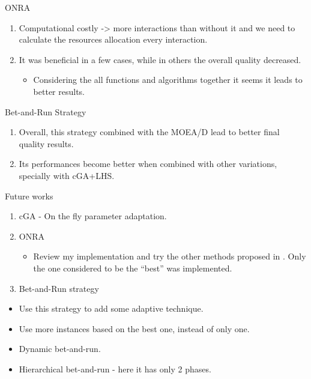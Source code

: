 \documentclass[ignorenonframetext,]{beamer}
\providecommand{\tightlist}{%
  \setlength{\itemsep}{0pt}\setlength{\parskip}{0pt}}
\begin{document}
\begin{frame}{ONRA}

\begin{enumerate}
\def\labelenumi{\arabic{enumi}.}
\tightlist
\item
  Computational costly -\textgreater{} more interactions than without it
  and we need to calculate the resources allocation every interaction.
\item
  It was beneficial in a few cases, while in others the overall quality
  decreased.

  \begin{itemize}
  \tightlist
  \item
    Considering the all functions and algorithms together it seems it
    leads to better results.
  \end{itemize}
\end{enumerate}

\end{frame}

\begin{frame}{Bet-and-Run Strategy}

\begin{enumerate}
\def\labelenumi{\arabic{enumi}.}
\tightlist
\item
  Overall, this strategy combined with the MOEA/D lead to better final
  quality results.
\item
  Its performances become better when combined with other variations,
  specially with cGA+LHS.
\end{enumerate}

\end{frame}

\begin{frame}{Future works}

\begin{enumerate}
\def\labelenumi{\arabic{enumi}.}
\tightlist
\item
  cGA - On the fly parameter adaptation.
\item
  ONRA

  \begin{itemize}
  \tightlist
  \item
    Review my implementation and try the other methods proposed in
    \citet{zhou2016all}. Only the one considered to be the ``best'' was
    implemented.
  \end{itemize}
\item
  Bet-and-Run strategy
\end{enumerate}

\begin{itemize}
\tightlist
\item
  Use this strategy to add some adaptive technique.
\item
  Use more instances based on the best one, instead of only one.
\item
  Dynamic bet-and-run.
\item
  Hierarchical bet-and-run - here it has only 2 phases.
\end{itemize}

\end{frame}
\end{document}
